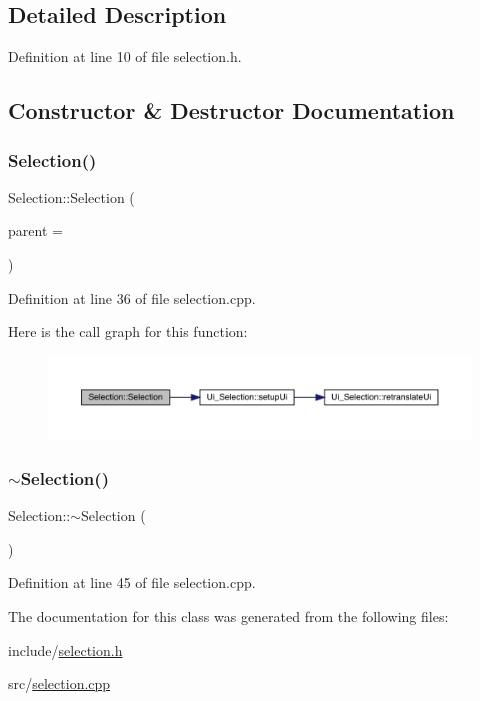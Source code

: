 \subsection{Detailed Description}


Definition at line 10 of file selection.\+h.



\subsection{Constructor \& Destructor Documentation}
\mbox{\label{class_selection_ab6a737100a92cf8dd040b6b7b439c5c1}} 
\subsubsection{\texorpdfstring{Selection()}{Selection()}}
{\footnotesize\ttfamily Selection\+::\+Selection (\begin{DoxyParamCaption}\item[{Q\+Widget $\ast$}]{parent = {} }\end{DoxyParamCaption})\hspace{0.3cm}{\ttfamily [explicit]}}



Definition at line 36 of file selection.\+cpp.

Here is the call graph for this function\+:
\nopagebreak
\begin{figure}[H]
\begin{center}
\leavevmode
\includegraphics[width=350pt]{class_selection_ab6a737100a92cf8dd040b6b7b439c5c1_cgraph}
\end{center}
\end{figure}
\mbox{\label{class_selection_a1860ec524d11c03de8c10a9354319839}} 
\subsubsection{\texorpdfstring{$\sim$\+Selection()}{~Selection()}}
{\footnotesize\ttfamily Selection\+::$\sim$\+Selection (\begin{DoxyParamCaption}{ }\end{DoxyParamCaption})}



Definition at line 45 of file selection.\+cpp.



The documentation for this class was generated from the following files\+:\begin{DoxyCompactItemize}
\item 
include/\mbox{\hyperlink{selection_8h}{selection.\+h}}\item 
src/\mbox{\hyperlink{selection_8cpp}{selection.\+cpp}}\end{DoxyCompactItemize}
